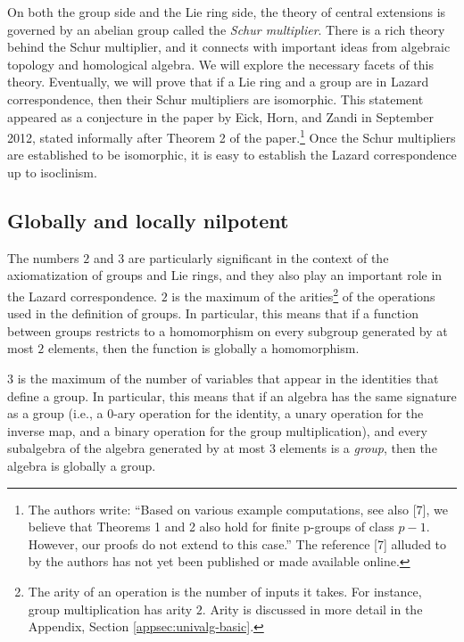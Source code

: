 \documentclass{ucetd}
\begin{document}
On both the group side and the Lie ring side, the theory of central
extensions is governed by an abelian group called the {\em Schur
  multiplier}. There is a rich theory behind the Schur multiplier, and
it connects with important ideas from algebraic topology and
homological algebra. We will explore the necessary facets of this
theory. Eventually, we will prove that if a Lie ring and a group are
in Lazard correspondence, then their Schur multipliers are
isomorphic. This statement appeared as a conjecture in the paper
\cite{SchurmultiplierandLazard} by Eick, Horn, and Zandi in September
2012, stated informally after Theorem 2 of the paper.\footnote{The
  authors write: ``Based on various example computations, see also
  [7], we believe that Theorems 1 and 2 also hold for finite p-groups
  of class $p - 1$. However, our proofs do not extend to this case.''
  The reference [7] alluded to by the authors has not yet been
  published or made available online.}  Once the Schur multipliers are
established to be isomorphic, it is easy to establish the Lazard
correspondence up to isoclinism.

\subsection{Globally and locally nilpotent}\label{sec:globally-and-locally-nilpotent}

The numbers $2$ and $3$ are particularly significant in the context of
the axiomatization of groups and Lie rings, and they also play an
important role in the Lazard correspondence. $2$ is the maximum of the
arities\footnote{The arity of an operation is the number of inputs it
  takes. For instance, group multiplication has arity $2$. Arity is
  discussed in more detail in the Appendix, Section
  \ref{appsec:univalg-basic}.} of the operations used in the definition
of groups. In particular, this means that if a function between groups
restricts to a homomorphism on every subgroup generated by at most $2$
elements, then the function is globally a homomorphism.

$3$ is the maximum of the number of variables that appear in the
identities that define a group. In particular, this means that if an
algebra has the same signature as a group (i.e., a $0$-ary operation
for the identity, a unary operation for the inverse map, and a binary
operation for the group multiplication), and every subalgebra of the
algebra generated by at most $3$ elements is a {\em group}, then the
algebra is globally a group.
\end{document}
